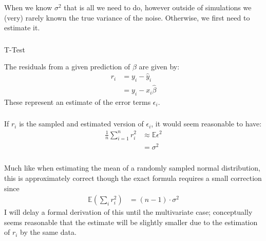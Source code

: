 \begin{frame}[fragile] \frametitle{}

When we know $\sigma^2$ that is all we need to do, however
outside of simulations we (very) rarely known the true variance
of the noise. Otherwise, we first need to estimate it.

\end{frame}

\begin{frame}[fragile] \frametitle{}

{\color{yaleblue}\fontsize{16pt}{20pt}\selectfont T-Test}

The residuals from a given prediction of $\beta$ are given by:
\begin{align*}
r_i &= y_i - \widehat{y}_i \\
&= y_i - x_i \widehat{\beta}
\end{align*}
These represent an estimate of the error terms $\epsilon_i$.

\end{frame}

\begin{frame}[fragile] \frametitle{}

If $r_i$ is the sampled and estimated version of $\epsilon_i$,
it would seem reasonable to have:
\begin{align*}
\frac{1}{n} \sum_{i=1}^n r_i^2 &\approx \mathbb{E} \epsilon^2 \\
&= \sigma^2
\end{align*}

\end{frame}

\begin{frame}[fragile] \frametitle{}

Much like when estimating the mean of a randomly sampled normal
distribution, this is approximately correct though the exact
formula requires a small correction since\pause
\begin{align*}
\mathbb{E} \left( \sum_i r_i^2 \right) &= (n-1) \cdot \sigma^2
\end{align*}
\pause I will delay a formal derivation of this until the multivariate
case; conceptually seems reasonable that the estimate will be slightly
smaller due to the estimation of $r_i$ by the same data.

\end{frame}


